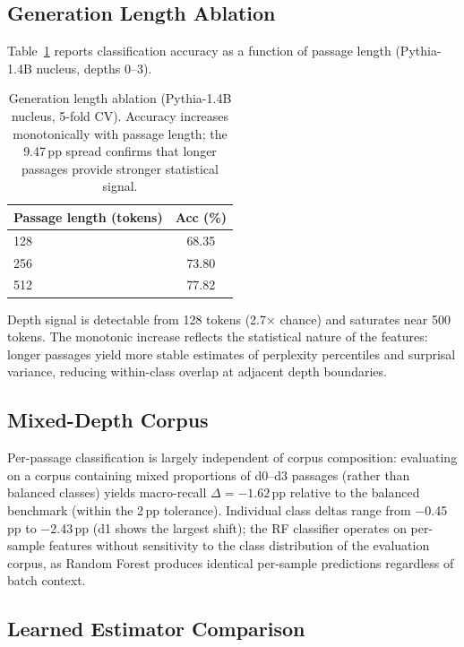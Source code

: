 \subsection{Generation Length Ablation}
\label{app:length_ablation}

Table~\ref{tab:length_ablation} reports classification accuracy as a function of passage length (Pythia-1.4B nucleus, depths 0--3).

\begin{table}[h]
\centering
\small
\caption{Generation length ablation (Pythia-1.4B nucleus, 5-fold CV). Accuracy increases monotonically with passage length; the 9.47\,pp spread confirms that longer passages provide stronger statistical signal.}
\label{tab:length_ablation}
\begin{tabular}{@{}lc@{}}
\toprule
Passage length (tokens) & Acc (\%) \\
\midrule
128 & 68.35 \\
256 & 73.80 \\
512 & 77.82 \\
\bottomrule
\end{tabular}
\end{table}

Depth signal is detectable from 128 tokens (2.7$\times$ chance) and saturates near 500 tokens.
The monotonic increase reflects the statistical nature of the features: longer passages yield more stable estimates of perplexity percentiles and surprisal variance, reducing within-class overlap at adjacent depth boundaries.

\subsection{Mixed-Depth Corpus}
\label{app:mixed_depth}

Per-passage classification is largely independent of corpus composition: evaluating on a corpus containing mixed proportions of d0--d3 passages (rather than balanced classes) yields macro-recall $\Delta{=}{-}1.62$\,pp relative to the balanced benchmark (within the 2\,pp tolerance).
Individual class deltas range from $-$0.45\,pp to $-$2.43\,pp (d1 shows the largest shift); the RF classifier operates on per-sample features without sensitivity to the class distribution of the evaluation corpus, as Random Forest produces identical per-sample predictions regardless of batch context.

\subsection{Learned Estimator Comparison}
\label{app:learned_estimator}

